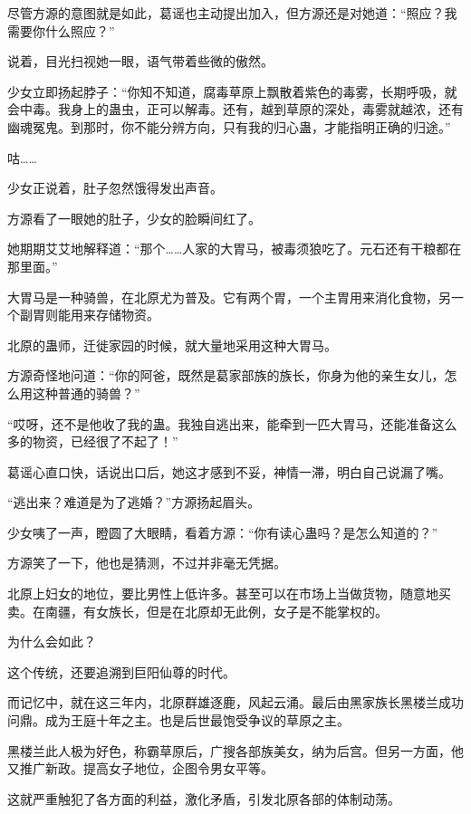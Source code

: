 
\begin{this_body}

尽管方源的意图就是如此，葛谣也主动提出加入，但方源还是对她道：“照应？我需要你什么照应？”

说着，目光扫视她一眼，语气带着些微的傲然。

少女立即扬起脖子：“你知不知道，腐毒草原上飘散着紫色的毒雾，长期呼吸，就会中毒。我身上的蛊虫，正可以解毒。还有，越到草原的深处，毒雾就越浓，还有幽魂冤鬼。到那时，你不能分辨方向，只有我的归心蛊，才能指明正确的归途。”

咕……

少女正说着，肚子忽然饿得发出声音。

方源看了一眼她的肚子，少女的脸瞬间红了。

她期期艾艾地解释道：“那个……人家的大胃马，被毒须狼吃了。元石还有干粮都在那里面。”

大胃马是一种骑兽，在北原尤为普及。它有两个胃，一个主胃用来消化食物，另一个副胃则能用来存储物资。

北原的蛊师，迁徙家园的时候，就大量地采用这种大胃马。

方源奇怪地问道：“你的阿爸，既然是葛家部族的族长，你身为他的亲生女儿，怎么用这种普通的骑兽？”

“哎呀，还不是他收了我的蛊。我独自逃出来，能牵到一匹大胃马，还能准备这么多的物资，已经很了不起了！”

葛谣心直口快，话说出口后，她这才感到不妥，神情一滞，明白自己说漏了嘴。

“逃出来？难道是为了逃婚？”方源扬起眉头。

少女咦了一声，瞪圆了大眼睛，看着方源：“你有读心蛊吗？是怎么知道的？”

方源笑了一下，他也是猜测，不过并非毫无凭据。

北原上妇女的地位，要比男性上低许多。甚至可以在市场上当做货物，随意地买卖。在南疆，有女族长，但是在北原却无此例，女子是不能掌权的。

为什么会如此？

这个传统，还要追溯到巨阳仙尊的时代。

而记忆中，就在这三年内，北原群雄逐鹿，风起云涌。最后由黑家族长黑楼兰成功问鼎。成为王庭十年之主。也是后世最饱受争议的草原之主。

黑楼兰此人极为好色，称霸草原后，广搜各部族美女，纳为后宫。但另一方面，他又推广新政。提高女子地位，企图令男女平等。

这就严重触犯了各方面的利益，激化矛盾，引发北原各部的体制动荡。


\end{this_body}
